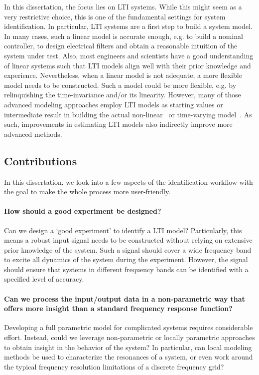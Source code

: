 In this dissertation, the focus lies on \gls{LTI} systems.
While this might seem as a very restrictive choice, this is one of the fundamental settings for system identification.
In particular, \gls{LTI} systems are a first step to build a system model.
In many cases, such a linear model is accurate enough, e.g. to build a nominal controller, to design electrical filters and obtain a reasonable intuition of the system under test.
Also, most engineers and scientists have a good understanding of linear systems such that \gls{LTI} models align well with their prior knowledge and experience.
Nevertheless, when a linear model is not adequate, a more flexible model needs to be constructed.
Such a model could be more flexible, e.g. by relinquishing the time-invariance and/or its linearity.
However, many of those advanced modeling approaches employ \gls{LTI} models as starting values or intermediate result in building the actual non-linear~\citep{Giri2010} or time-varying model~\citep{Lataire2012,Louarroudi2014}.
As such, improvements in estimating \gls{LTI} models also indirectly improve more advanced methods.

\subsection{Contributions}
In this dissertation, we look into a few aspects of the identification workflow with the goal to make the whole process more user-friendly.

\paragraph{How should a good experiment be designed?}
Can we design a `good experiment' to identify a \gls{LTI} model?
Particularly, this means a robust input signal needs to be constructed without relying on extensive prior knowledge of the system.
Such a signal should cover a wide frequency band to excite all dynamics of the system during the experiment.
However, the signal should ensure that systems in different frequency bands can be identified with a specified level of accuracy.

\paragraph{Can we process the input/output data in a non-parametric way that offers more insight than a standard frequency response function?}
Developing a full parametric model for complicated systems requires considerable effort.
Instead, could we leverage non-parametric or locally parametric approaches to obtain insight in the behavior of the system?
In particular, can local modeling methods be used to characterize the resonances of a system, or even work around the typical frequency resolution limitations of a discrete frequency grid?

